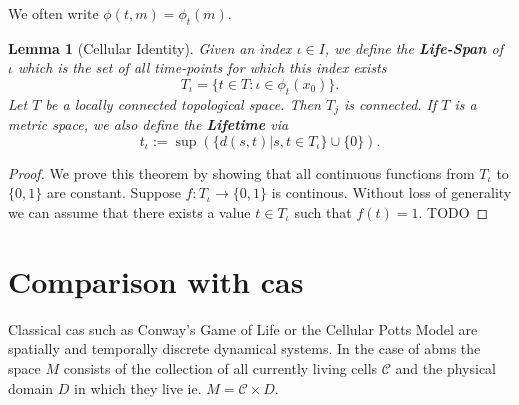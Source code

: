 \documentclass{article}
\newtheorem{lemma}[definition]{Lemma}
\begin{document}
We often write $\phi(t,m) = \phi_t(m)$.

\begin{lemma}[Cellular Identity]
    \label{thm:cellular-uniqueness}
    Given an index $\iota\in I$, we define the \textbf{Life-Span} of $\iota$ which is the set of all
    time-points for which this index exists 
    \begin{equation}
        T_\iota=\{t\in T: \iota\in\phi_t(x_0)\}.
    \end{equation}
    Let $T$ be a locally connected topological space.
    Then $T_j$ is connected.
    If $T$ is a metric space, we also define the \textbf{Lifetime} via
    \begin{equation}
        t_\iota:=\sup\left(\{d(s,t)|s,t\in T_\iota\}\cup\{0\}\right).
    \end{equation}
\end{lemma}
\begin{proof}
    We prove this theorem by showing that all continuous functions from $T_\iota$ to $\{0,1\}$ are
    constant.
    Suppose $f:T_\iota\rightarrow\{0,1\}$ is continous.
    Without loss of generality we can assume that there exists a value $t\in T_\iota$ such that
    $f(t)=1$.
    TODO
\end{proof}

\section{Comparison with \aclp{ca}}
\label{section:comparison-with-ca}
Classical \acp{ca} such as Conway's Game of Life \cite{Graner1992} or the Cellular Potts Model
\cite{games1970fantastic} are spatially and temporally discrete dynamical systems.
In the case of \acp{abm} the space $M$ consists of the collection of all currently living cells
$\mathscr{C}$ and the physical domain $D$ in which they live ie. $M=\mathscr{C}\times D$.
\end{document}
